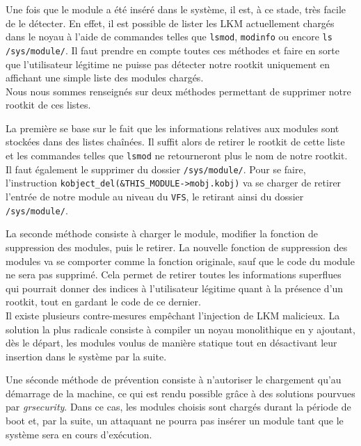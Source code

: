 \documentclass[12pt]{article}
\begin{document}
        Une fois que le module a été inséré dans le système, il est, à ce stade, très facile de le détecter. En effet, il est possible de lister les LKM actuellement chargés dans le noyau à l'aide de commandes telles que \texttt{lsmod}, \texttt{modinfo} ou encore \texttt{ls /sys/module/}. Il faut prendre en compte toutes ces méthodes et faire en sorte que l'utilisateur légitime ne puisse pas  détecter notre rootkit uniquement en affichant une simple liste des modules chargés. \\

        Nous nous sommes renseignés sur deux méthodes permettant de supprimer notre rootkit de ces listes.

        La première se base sur le fait que les informations relatives aux modules sont stockées dans des listes chaînées. Il suffit alors de retirer le rootkit de cette liste et les commandes telles que \texttt{lsmod} ne retourneront plus le nom de notre rootkit. Il faut également le supprimer du dossier \texttt{/sys/module/}. Pour se faire, l'instruction \texttt{kobject\_del(\&THIS\_MODULE->mobj.kobj)} va se charger de retirer l'entrée de notre module au niveau du \texttt{VFS}, le retirant ainsi du dossier \texttt{/sys/module/}.

        La seconde méthode consiste à charger le module, modifier la fonction de suppression des modules, puis le retirer\cite{spacelkm}. La nouvelle fonction de suppression des modules va se comporter comme la fonction originale, sauf que le code du module ne sera pas supprimé. Cela permet de retirer toutes les informations superflues qui pourrait donner des indices à l'utilisateur légitime quant à la présence d'un rootkit, tout en gardant le code de ce dernier. \\
        
        Il existe plusieurs contre-mesures empêchant l'injection de LKM malicieux. La solution la plus radicale consiste à compiler un noyau monolithique en y ajoutant, dès le départ, les modules voulus de manière statique tout en désactivant leur insertion dans le système par la suite.

        Une séconde méthode de prévention consiste à n'autoriser le chargement qu'au démarrage de la machine, ce qui est rendu possible grâce à des solutions pourvues par \textit{grsecurity}. Dans ce cas, les modules choisis sont chargés durant la période de boot et, par la suite, un attaquant ne pourra pas insérer un module tant que le système sera en cours d'exécution.
\end{document}
